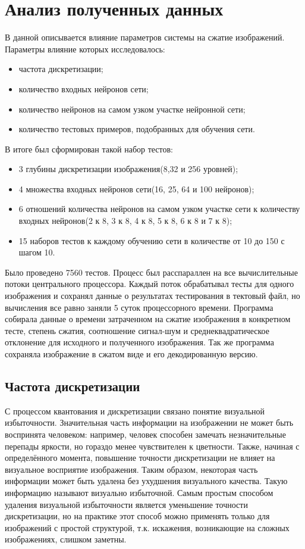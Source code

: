 \chapter{Анализ полученных данных}
\label{sec:analysis}

В данной описывается влияние параметров системы на сжатие изображений.
Параметры влияние которых исследовалось:

\begin{itemize}
  \item частота дискретизации;
  \item количество входных нейронов сети;
  \item количество нейронов на самом узком участке нейронной сети;
  \item количество тестовых примеров, подобранных для обучения сети.
\end{itemize}

В итоге был сформирован такой набор тестов:

\begin{itemize}
  \item 3 глубины дискретизации изображения(8,32 и 256 уровней);
  \item 4 множества входных нейронов сети(16, 25, 64 и 100 нейронов);
  \item 6 отношений количества нейронов на самом узком участке сети к количеству входных нейронов(2 к 8, 3 к 8, 4 к 8, 5 к 8, 6 к 8 и 7 к 8);
  \item 15 наборов тестов к каждому обучению сети в количестве от 10 до 150 с шагом 10.
\end{itemize}

Было проведено 7560 тестов. Процесс был расспараллен на все вычислительные потоки центрального процессора.
Каждый поток обрабатывал тесты для одного изображения и сохранял данные о результатах тестирования в тектовый файл,
но вычисления все равно заняли 5 суток процессорного времени.
Программа собирала данные о времени затраченном на сжатие изображения в конкретном тесте, степень сжатия,
соотношение сигнал-шум и среднеквадратическое отклонение для исходного и полученного изображения.
Так же программа сохраняла изображение в сжатом виде и его декодированную версию.

\section{Частота дискретизации}
\label{sub:analysis:discrete}
С процессом квантования и дискретизации связано понятие визуальной избыточности.
Значительная часть информации на изображении не может быть воспринята человеком:
например, человек способен замечать незначительные перепады яркости,
но гораздо менее чувствителен к цветности. Также, начиная с определённого момента,
повышение точности дискретизации не влияет на визуальное восприятие изображения.
Таким образом, некоторая часть информации может быть удалена без ухудшения визуального качества.
Такую информацию называют визуально избыточной. Самым простым способом удаления визуальной
избыточности является уменьшение точности дискретизации, но на практике этот способ можно
применять только для изображений с простой структурой, т.к. искажения, возникающие на сложных изображениях, слишком заметны.

